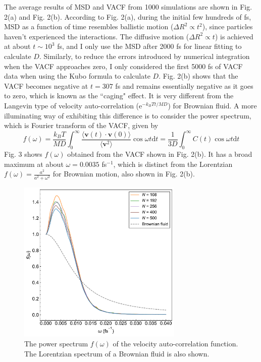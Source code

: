 \documentclass{article}
\newcommand{\diff}[1]{\mathrm{d} #1}
\newcommand{\Exp}[1]{\mathrm{e}^{#1}}
\newcommand{\ang}[1]{{\langle #1 \rangle}}
\begin{document}
The average results of MSD and VACF from 1000 simulations are shown in Fig. 2(a) and Fig. 2(b). According to Fig. 2(a), during the initial few hundreds of fs, MSD as a function of time resembles ballistic motion ($\Delta R^2 \propto t^2$), since particles haven't experienced the interactions. The diffusive motion ($\Delta R^2 \propto t$) is achieved at about $t \sim 10^3$ fs, and I only use the MSD after 2000 fs for linear fitting to calculate $D$. Similarly, to reduce the errors introduced by numerical integration when the VACF approaches zero, I only considered the first 5000 fs of VACF data when using the Kubo formula to calculate $D$. Fig. 2(b) shows that the VACF becomes negative at $t = 307$ fs and remains essentially negative as it goes to zero, which is known as the ``caging" effect. It is very different from the Langevin type of velocity auto-correlation ($\Exp{-k_B Tt / MD}$) for Brownian fluid. A more illuminating way of exhibiting this difference is to consider the power spectrum, which is Fourier transform of the VACF, given by
\[
    f(\omega) = \frac{k_B T}{MD} \int_{0}^{\infty} \frac{\ang{\mathbf{v}(t)\cdot \mathbf{v}(0)}}{\ang{\mathbf{v}^2}} \cos \omega t \diff{t} = \frac{1}{3D} \int_{0}^{\infty} C(t) \cos \omega t \diff{t}
\]
Fig. 3 shows $f(\omega)$ obtained from the VACF shown in Fig. 2(b). It has a broad maximum at about $\omega = 0.0035$ fs$^{-1}$, which is distinct from the Lorentzian $f(\omega) = \frac{a^2}{a^2 + \omega^2}$ for Brownian motion, also shown in Fig. 2(b).
\begin{figure}
    \centering
    \includegraphics[width=0.7\textwidth]{ps.pdf}
    \caption{The power spectrum $f(\omega)$ of the velocity auto-correlation function. The Lorentzian spectrum of a Brownian fluid is also shown.}
\end{figure}
\end{document}
